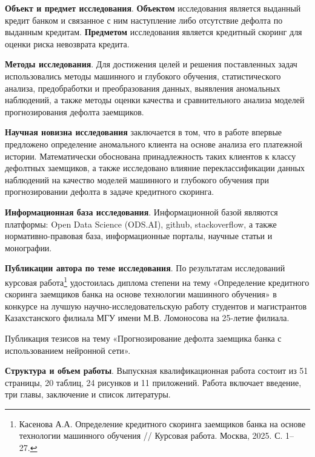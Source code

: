         \textbf{Объект и предмет исследования}. \textbf{Объектом} исследования является выданный кредит банком и связанное с ним наступление либо отсутствие дефолта по выданным кредитам. \textbf{Предметом} исследования является кредитный скоринг для оценки риска невозврата кредита.
        
        \textbf{Методы исследования}. Для достижения целей и решения поставленных задач использовались методы машинного и глубокого обучения, статистического анализа, предобработки и преобразования данных, выявления аномальных наблюдений, а также методы оценки качества и сравнительного анализа моделей прогнозирования дефолта заемщиков.

        \textbf{Научная новизна исследования} заключается в том, что в работе впервые предложено определение аномального клиента на основе анализа его платежной истории. Математически обоснована принадлежность таких клиентов к классу дефолтных заемщиков, а также исследовано влияние переклассификации данных наблюдений на качество моделей машинного и глубокого обучения при прогнозировании дефолта в задаче кредитного скоринга.
        
        \textbf{Информационная база исследования}. Информационной базой являются платформы: Open Data Science (ODS.AI), github, stackoverflow, а также нормативно-правовая база, информационные порталы, научные статьи и монографии.
        
        \textbf{Публикации автора по теме исследования}. По результатам исследований курсовая работа\footnote{Касенова А.А. Определение кредитного скоринга заемщиков банка на основе технологии машинного обучения // Курсовая работа. Москва, 2025. С. 1--27.} удостоилась диплома  степени на тему «Определение кредитного скоринга заемщиков банка на основе технологии машинного обучения» в конкурсе на лучшую научно-исследовательскую работу студентов и магистрантов Казахстанского филиала МГУ имени М.В. Ломоносова на 25-летие филиала.
        
        Публикация тезисов на тему «Прогнозирование дефолта заемщика банка с использованием нейронной сети».
        
        \textbf{Структура и объем работы}. Выпускная квалификационная работа состоит из 51 страницы, 20 таблиц, 24 рисунков и 11 приложений. Работа включает введение, три главы, заключение и список литературы.